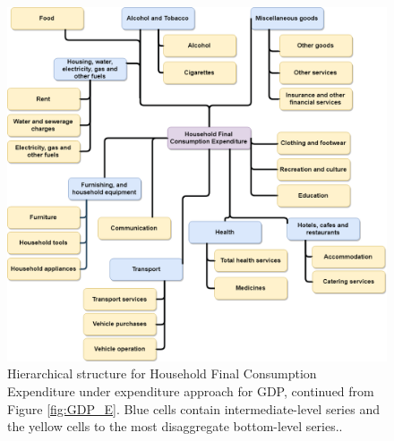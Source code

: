 \documentclass[graybox]{svmult}
\begin{document}
\begin{figure}[H]
	\centering
	\includegraphics[width=\textwidth]{Figs/HFCE.PNG}
	\caption{Hierarchical structure for Household Final Consumption Expenditure under expenditure approach for GDP, continued from Figure \ref{fig:GDP_E}. Blue cells contain intermediate-level series and the yellow cells to the most disaggregate bottom-level series..}\label{fig:HFCE}
\end{figure}
\end{document}
